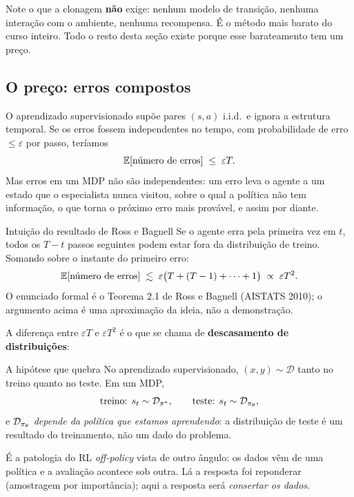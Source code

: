 \documentclass[11pt]{article}
\newcommand{\thv}{\theta}
\newcommand{\polth}{\pol_{\thv}}
\newcommand{\polE}{\pol^{*}}
\newcommand{\Dtot}{\mathcal{D}}
\begin{document}
\begin{alertabox}
  Note o que a clonagem \textbf{não} exige: nenhum modelo de transição, nenhuma
  interação com o ambiente, nenhuma recompensa. É o método mais barato do curso inteiro.
  Todo o resto desta seção existe porque esse barateamento tem um preço.
\end{alertabox}

\subsection{O preço: erros compostos}

O aprendizado supervisionado supõe pares $(s,a)$ i.i.d.\ e ignora a estrutura temporal.
Se os erros fossem independentes no tempo, com probabilidade de erro $\le \varepsilon$
por passo, teríamos
\[
  \mathbb{E}[\text{número de erros}] \;\le\; \varepsilon T .
\]
Mas erros em um MDP não são independentes: um erro leva o agente a um estado que o
especialista nunca visitou, sobre o qual a política não tem informação, o que torna o
próximo erro mais provável, e assim por diante.

\begin{teobox}{Intuição do resultado de Ross e Bagnell}
  Se o agente erra pela primeira vez em $t$, todos os $T-t$ passos seguintes podem estar
  fora da distribuição de treino. Somando sobre o instante do primeiro erro:
  \[
    \mathbb{E}[\text{número de erros}] \;\lesssim\;
      \varepsilon\bigl(T + (T-1) + \cdots + 1\bigr) \;\propto\; \varepsilon T^2 .
  \]
  O enunciado formal é o Teorema 2.1 de Ross e Bagnell (AISTATS 2010); o argumento acima
  é uma aproximação da ideia, não a demonstração.
\end{teobox}

A diferença entre $\varepsilon T$ e $\varepsilon T^2$ é o que se chama de
\textbf{descasamento de distribuições}:

\begin{defbox}{A hipótese que quebra}
  No aprendizado supervisionado, $(x,y)\sim\Dtot$ tanto no treino quanto no teste. Em um
  MDP,
  \[
    \text{treino: } s_t \sim \Dtot_{\polE},
    \qquad
    \text{teste: } s_t \sim \Dtot_{\polth},
  \]
  e $\Dtot_{\polth}$ \emph{depende da política que estamos aprendendo}: a distribuição de
  teste é um resultado do treinamento, não um dado do problema.
\end{defbox}

\begin{ideiabox}
  É a patologia do RL \emph{off-policy} vista de outro ângulo: os dados vêm de uma
  política e a avaliação acontece sob outra. Lá a resposta foi reponderar (amostragem por
  importância); aqui a resposta será \emph{consertar os dados}.
\end{ideiabox}
\end{document}
